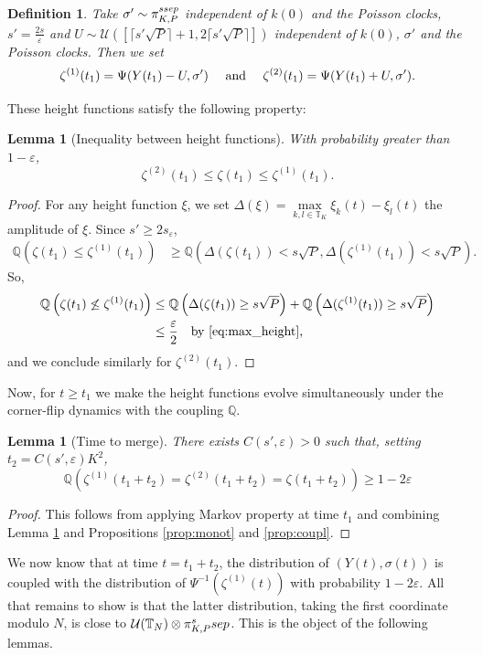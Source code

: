 \documentclass[11pt,a4paper]{article}
\newcommand{\T}{\mathbb{T}}
\newcommand{\Q}{\mathbb{Q}}
\newcommand{\SSEP}{\textsc{ssep}}
\newcommand\entc[1]{\lceil #1 \rceil}
\newtheorem{lemma}[theorem]{Lemma}
\newtheorem{definition}{Definition}[section]
\newcommand{\eqs}[1]{\begin{equation}#1\end{equation}}
\begin{document}
\begin{definition}\label{def:init_cond}
Take $\sigma' \sim \pi^{\SSEP}_{K,P}$ independent of $k(0)$ and the Poisson clocks, $s' = \frac{2s}{\varepsilon}$ and $U \sim \mathcal{U}\left(\left[ \entc{ s' \sqrt{P}}+1, 2\entc{ s' \sqrt{P} }\right]\right)$ independent of $k(0)$, $\sigma'$ and the Poisson clocks. Then we set
\eqs{\zeta^{(1)}(t_1) = \Psi(Y(t_1) - U,\sigma') \quad\hbox{ and }\quad\zeta^{(2)}(t_1) = \Psi(Y(t_1) + U,\sigma').}\end{definition}
These height functions satisfy the following property:
\begin{lemma}[Inequality between height functions] \label{lem:ineq_height}
With probability greater than $1-\varepsilon$,
\eqs{\zeta^{(2)}(t_1) \le \zeta(t_1) \le \zeta^{(1)}(t_1).}
\end{lemma}
\begin{proof} For any height function $\xi$, we set $\Delta(\xi) = \max\limits_{k,l\in \T_K}\xi_k(t) - \xi_l(t) $ the amplitude of $\xi$. Since $s' \ge 2s_\varepsilon$, 
\begin{align}
\Q\left(\zeta(t_1) \leq \zeta^{(1)}(t_1)\right) & \ge \Q\left(\Delta(\zeta(t_1)) < s \sqrt{P}, \Delta(\zeta^{(1)}(t_1)) < s \sqrt{P}\right). 
\end{align}
So, 
\begin{align*}\Q\left(\zeta(t_1) \not \le \zeta^{(1)}(t_1)\right) &\le \Q\left(\Delta(\zeta(t_1)) \ge s \sqrt{P}\right)+\Q\left(\Delta(\zeta^{(1)}(t_1)) \ge s \sqrt{P}\right)\\
& \le \frac{\varepsilon}{2} \quad \text{by \eqref{eq:max_height},}
\end{align*} 
and we conclude similarly for $\zeta^{(2)}(t_1)$.
\end{proof}
Now, for $t\ge t_1$ we make the height functions evolve simultaneously under the corner-flip dynamics with the coupling $\Q$.
\begin{lemma}[Time to merge] \label{lem:merge}There exists $C(s',\varepsilon)>0$ such that, setting $t_2 = C(s',\varepsilon)K^2$,
\eqs{\Q\left(\zeta^{(1)}(t_1+t_2) = \zeta^{(2)}(t_1+t_2) = \zeta(t_1+t_2)\right) \ge 1- 2\varepsilon}
\end{lemma}
\begin{proof}
This follows from applying Markov property at time $t_1$ and combining Lemma \ref{lem:ineq_height} and Propositions \ref{prop:monot} and \ref{prop:coupl}. 
\end{proof}

We now know that at time $t=t_1+t_2$, the distribution of $(Y(t),\sigma(t))$ is coupled with the distribution of $\Psi^{-1}(\zeta^{(1)}(t))$ with probability $1-2\varepsilon$. All that remains to show is that the latter distribution, taking the first coordinate modulo $N$, is close to $\mathcal{U}(\T_N) \otimes \pi_{K,P}^\SSEP$. This is the object of the following lemmas.
\end{document}
